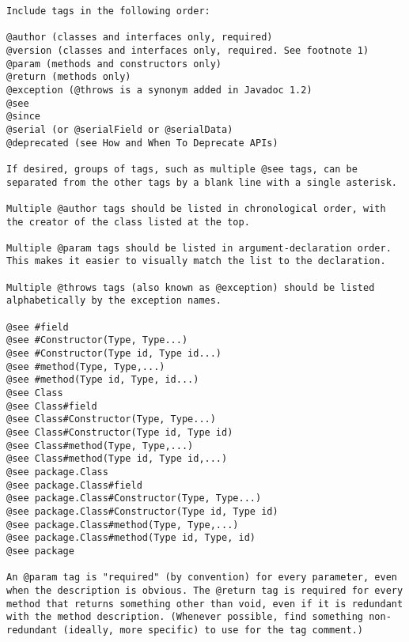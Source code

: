 \begin{lstlisting}
Include tags in the following order:

@author (classes and interfaces only, required)
@version (classes and interfaces only, required. See footnote 1)
@param (methods and constructors only)
@return (methods only)
@exception (@throws is a synonym added in Javadoc 1.2)
@see
@since
@serial (or @serialField or @serialData)
@deprecated (see How and When To Deprecate APIs)

If desired, groups of tags, such as multiple @see tags, can be separated from the other tags by a blank line with a single asterisk.

Multiple @author tags should be listed in chronological order, with the creator of the class listed at the top.

Multiple @param tags should be listed in argument-declaration order. This makes it easier to visually match the list to the declaration.

Multiple @throws tags (also known as @exception) should be listed alphabetically by the exception names.  

@see #field
@see #Constructor(Type, Type...)
@see #Constructor(Type id, Type id...)
@see #method(Type, Type,...)
@see #method(Type id, Type, id...)
@see Class
@see Class#field
@see Class#Constructor(Type, Type...)
@see Class#Constructor(Type id, Type id)
@see Class#method(Type, Type,...)
@see Class#method(Type id, Type id,...)
@see package.Class
@see package.Class#field
@see package.Class#Constructor(Type, Type...)
@see package.Class#Constructor(Type id, Type id)
@see package.Class#method(Type, Type,...)
@see package.Class#method(Type id, Type, id)
@see package

An @param tag is "required" (by convention) for every parameter, even when the description is obvious. The @return tag is required for every method that returns something other than void, even if it is redundant with the method description. (Whenever possible, find something non-redundant (ideally, more specific) to use for the tag comment.)

\end{lstlisting}